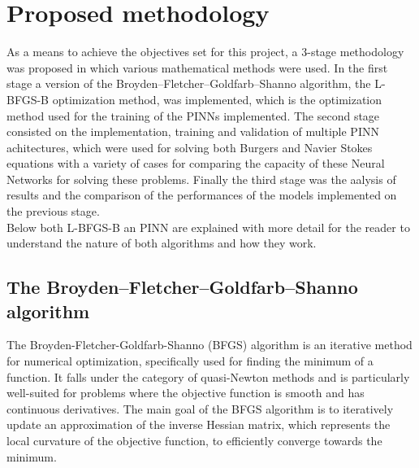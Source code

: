 \documentclass[12pt,letterpaper]{article}
\begin{document}
\section{Proposed methodology}

As a means to achieve the objectives set for this project, a 3-stage methodology was proposed in which various mathematical methods were used. In the first stage a version of the Broyden–Fletcher–Goldfarb–Shanno algorithm, the L-BFGS-B optimization method, was implemented, which is the optimization method used for the training of the PINNs implemented. The second stage consisted on the implementation, training and validation of multiple PINN achitectures, which were used for solving both Burgers and Navier Stokes equations with a variety of cases for comparing the capacity of these Neural Networks for solving these problems. Finally the third stage was the aalysis of results and the comparison of the performances of the models implemented on the previous stage.\\

Below both L-BFGS-B an PINN are explained with more detail for the reader to understand the nature of both algorithms and how they work.

\subsection{The Broyden–Fletcher–Goldfarb–Shanno algorithm}

The Broyden-Fletcher-Goldfarb-Shanno (BFGS) algorithm is an iterative method for numerical optimization, specifically used for finding the minimum of a function. It falls under the category of quasi-Newton methods and is particularly well-suited for problems where the objective function is smooth and has continuous derivatives. The main goal of the BFGS algorithm is to iteratively update an approximation of the inverse Hessian matrix, which represents the local curvature of the objective function, to efficiently converge towards the minimum.\\
\end{document}
